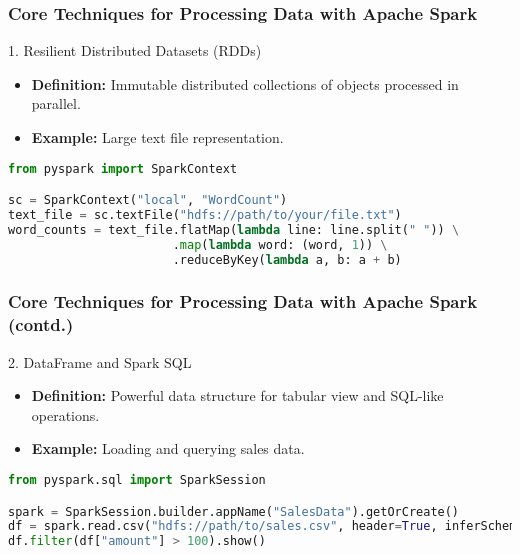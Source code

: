 \documentclass[aspectratio=169]{beamer}
\begin{document}
\begin{frame}[fragile]
    \frametitle{Core Techniques for Processing Data with Apache Spark}
    \begin{block}{1. Resilient Distributed Datasets (RDDs)}
        \begin{itemize}
            \item \textbf{Definition:} Immutable distributed collections of objects processed in parallel.
            \item \textbf{Example:} Large text file representation.
        \end{itemize}
        \begin{lstlisting}[language=Python]
from pyspark import SparkContext

sc = SparkContext("local", "WordCount")
text_file = sc.textFile("hdfs://path/to/your/file.txt")
word_counts = text_file.flatMap(lambda line: line.split(" ")) \
                       .map(lambda word: (word, 1)) \
                       .reduceByKey(lambda a, b: a + b)
        \end{lstlisting}
    \end{block}
\end{frame}

\begin{frame}[fragile]
    \frametitle{Core Techniques for Processing Data with Apache Spark (contd.)}
    \begin{block}{2. DataFrame and Spark SQL}
        \begin{itemize}
            \item \textbf{Definition:} Powerful data structure for tabular view and SQL-like operations.
            \item \textbf{Example:} Loading and querying sales data.
        \end{itemize}
        \begin{lstlisting}[language=Python]
from pyspark.sql import SparkSession

spark = SparkSession.builder.appName("SalesData").getOrCreate()
df = spark.read.csv("hdfs://path/to/sales.csv", header=True, inferSchema=True)
df.filter(df["amount"] > 100).show()
        \end{lstlisting}
    \end{block}
\end{frame}
\end{document}
